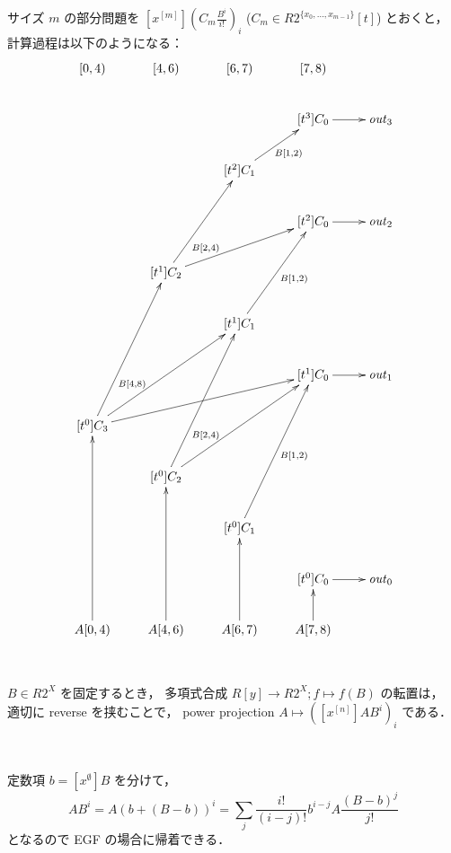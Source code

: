 \documentclass{jsarticle}
\begin{document}
サイズ $m$ の部分問題を $[x^{[m]}] \left( C_m \frac{B^i}{i!} \right)_i$
($C_m \in R 2^{\{x_0,\ldots,x_{m-1}\}} [t]$) とおくと，
計算過程は以下のようになる：
\[
  \xymatrix{
    [0, 4) & [4, 6) & [6, 7) & [7, 8) & \\
    & & & [t^3] C_0 \ar[r] & \mathit{out}_3 \\
    & & [t^2] C_1 \ar[ur]_{B[1,2)} & & \\
    & & & [t^2] C_0 \ar[r] & \mathit{out}_2 \\
    & [t^1] C_2 \ar[uur]_(.3){B[2,4)} \ar[urr] & & & \\
    & & [t^1] C_1 \ar[uur]_{B[1,2)} & & \\
    & & & [t^1] C_0 \ar[r] & \mathit{out}_1 \\
    [t^0] C_3 \ar[uuur]_(.3){B[4,8)} \ar[uurr] \ar[urrr] & & & & \\
    & [t^0] C_2 \ar[uuur]_(.3){B[2,4)} \ar[uurr] & & &\\
    & & [t^0] C_1 \ar[uuur]_{B[1,2)} & & \\
    & & & [t^0] C_0 \ar[r] & \mathit{out}_0 \\
    A[0,4) \ar[uuuu] & A[4,6) \ar[uuu] & A[6,7) \ar[uu] & A[7,8) \ar[u] & \\
  }
\]

\

$B \in R 2^X$ を固定するとき，
多項式合成 $R[y] \to R 2^X; f \mapsto f(B)$ の転置は，
適切に reverse を挟むことで，
power projection $A \mapsto \left([x^{[n]}] A B^i\right)_i$
である．

\

定数項 $b = [x^\emptyset] B$ を分けて，
\[
  A B^i
  = A (b + (B-b))^i
  = \sum_j \frac{i!}{(i-j)!} b^{i-j} A \frac{(B-b)^j}{j!}
\]
となるので EGF の場合に帰着できる．
\end{document}
